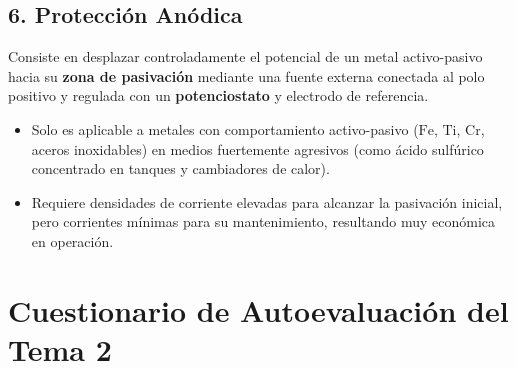 \subsection{6. Protección Anódica}
Consiste en desplazar controladamente el potencial de un metal activo-pasivo hacia su \textbf{zona de pasivación} mediante una fuente externa conectada al polo positivo y regulada con un \textbf{potenciostato} y electrodo de referencia.
\begin{itemize}
    \item Solo es aplicable a metales con comportamiento activo-pasivo ($\text{Fe}$, $\text{Ti}$, $\text{Cr}$, aceros inoxidables) en medios fuertemente agresivos (como ácido sulfúrico concentrado en tanques y cambiadores de calor).
    \item Requiere densidades de corriente elevadas para alcanzar la pasivación inicial, pero corrientes mínimas para su mantenimiento, resultando muy económica en operación.
\end{itemize}

\section{Cuestionario de Autoevaluación del Tema 2}


